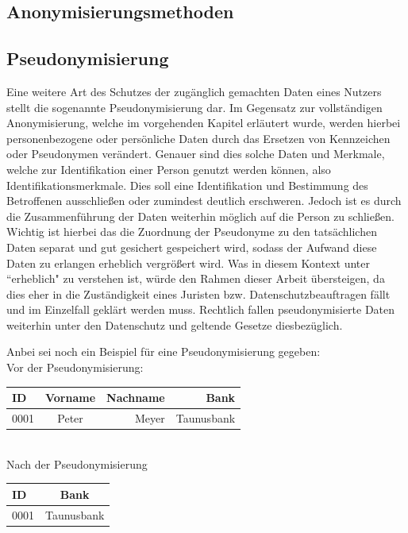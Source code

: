 \documentclass[a4paper, 12pt]{article}
\begin{document}
\subsection{Anonymisierungsmethoden}

\subsection{Pseudonymisierung}

Eine weitere Art des Schutzes der zugänglich gemachten Daten eines Nutzers stellt die sogenannte Pseudonymisierung dar. Im Gegensatz zur vollständigen Anonymisierung, welche im vorgehenden Kapitel erläutert wurde, werden hierbei personenbezogene oder persönliche Daten durch das Ersetzen von Kennzeichen oder Pseudonymen verändert. Genauer sind dies solche Daten und Merkmale, welche zur Identifikation einer Person genutzt werden können, also Identifikationsmerkmale. Dies soll eine Identifikation und Bestimmung des Betroffenen ausschließen oder zumindest deutlich erschweren. Jedoch ist es durch die Zusammenführung der Daten weiterhin möglich auf die Person zu schließen. Wichtig ist hierbei das die Zuordnung der Pseudonyme zu den tatsächlichen Daten separat und gut gesichert gespeichert wird, sodass der Aufwand diese Daten zu erlangen erheblich vergrößert wird. Was in diesem Kontext unter ``erheblich" zu verstehen ist, würde den Rahmen dieser Arbeit übersteigen, da dies eher in die Zuständigkeit eines Juristen bzw. Datenschutzbeauftragen fällt und im Einzelfall geklärt werden muss. Rechtlich fallen pseudonymisierte Daten weiterhin unter den Datenschutz und geltende Gesetze diesbezüglich.
\cite{thesing_anonym_pseudonym, datenschutz_pseudonymisierung}

\noindent Anbei sei noch ein Beispiel für eine Pseudonymisierung gegeben:\\

\noindent Vor der Pseudonymisierung:\\

\begin{tabular}{lcrr}
	
	ID & Vorname & Nachname & Bank \\
	\hline
	0001 & Peter & Meyer & Taunusbank
	
\end{tabular}\\

\noindent Nach der Pseudonymisierung\\

\begin{tabular}{lc}
	
	ID & Bank \\
	\hline
	0001 & Taunusbank
	
\end{tabular}\\\\
\end{document}

